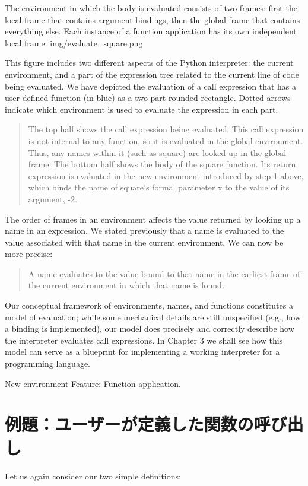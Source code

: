 \documentclass[letterpaper,10pt,dvipdfmx]{sphinxmanual}
\begin{document}
The environment in which the body is evaluated consists of two frames: first the local frame that contains argument bindings, then the global frame that contains everything else. Each instance of a function application has its own independent local frame.
img/evaluate\_square.png

This figure includes two different aspects of the Python interpreter: the current environment, and a part of the expression tree related to the current line of code being evaluated. We have depicted the evaluation of a call expression that has a user-defined function (in blue) as a two-part rounded rectangle. Dotted arrows indicate which environment is used to evaluate the expression in each part.
\begin{quote}

The top half shows the call expression being evaluated. This call expression is not internal to any function, so it is evaluated in the global environment. Thus, any names within it (such as square) are looked up in the global frame.
The bottom half shows the body of the square function. Its return expression is evaluated in the new environment introduced by step 1 above, which binds the name of square's formal parameter x to the value of its argument, -2.
\end{quote}

The order of frames in an environment affects the value returned by looking up a name in an expression. We stated previously that a name is evaluated to the value associated with that name in the current environment. We can now be more precise:
\begin{quote}

A name evaluates to the value bound to that name in the earliest frame of the current environment in which that name is found.
\end{quote}

Our conceptual framework of environments, names, and functions constitutes a model of evaluation; while some mechanical details are still unspecified (e.g., how a binding is implemented), our model does precisely and correctly describe how the interpreter evaluates call expressions. In Chapter 3 we shall see how this model can serve as a blueprint for implementing a working interpreter for a programming language.

New environment Feature: Function application.


\section{例題：ユーザーが定義した関数の呼び出し}
\label{functions:id16}
Let us again consider our two simple definitions:
\end{document}
